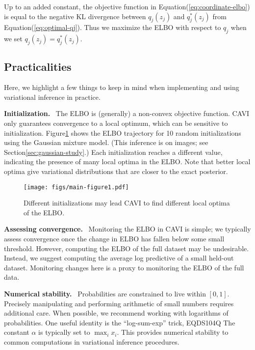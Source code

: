 \documentclass{article}
\DeclareRobustCommand{\parhead}[1]{\textbf{#1}~}
\begin{document}
Up to an added constant, the objective function in
Equation\nobreakspace \textup {(\ref {eq:coordinate-elbo})} is equal to the negative \gls{KL} divergence between
$q_{j}(z_j)$ and $q^*_{j}(z_j)$ from Equation\nobreakspace \textup {(\ref {eq:optimal-qj})}. Thus we
maximize the \gls{ELBO} with respect to $q_j$ when we set
$q_{j}(z_j) = q^*_{j}(z_j)$.

\subsection{Practicalities}
\label{sec:practicalities}

Here, we highlight a few things to keep in mind when implementing and
using variational inference in practice.

\parhead{Initialization.}  The \gls{ELBO} is (generally) a non-convex
objective function. \gls{CAVI} only guarantees convergence to a local
optimum, which can be sensitive to initialization. Figure\nobreakspace \ref {fig:init}
shows the \gls{ELBO} trajectory for 10 random initializations using
the Gaussian mixture model.  (This inference is on images; see
Section\nobreakspace \ref {sec:gaussian-study}.) Each initialization reaches a different
value, indicating the presence of many local optima in the \gls{ELBO}.
Note that better local optima give variational distributions that are
closer to the exact posterior.

\begin{figure}[htb]
  \centering
  \texttt{[image: figs/main-figure1.pdf]}
  \caption{Different initializations may lead \gls{CAVI} to find different local
optima of the \gls{ELBO}.}
  \label{fig:init}
\end{figure}

\parhead{Assessing convergence.} Monitoring the \gls{ELBO} in
\gls{CAVI} is simple; we typically assess convergence once the change
in \gls{ELBO} has fallen below some small threshold. However,
computing the \gls{ELBO} of the full dataset may be
undesirable. Instead, we suggest computing the average log predictive
of a small held-out dataset. Monitoring changes here is a proxy to
monitoring the \gls{ELBO} of the full data.

\parhead{Numerical stability.} Probabilities are constrained to live
within $ [0,1]$. Precisely manipulating and performing arithmetic of
small numbers requires additional care. When possible, we recommend
working with logarithms of probabilities.  One useful identity is the
``log-sum-exp'' trick,
EQDS104Q
The constant $\alpha$ is typically set to $\max_i x_i$. This provides
numerical stability to common computations in variational inference
procedures.
\end{document}
